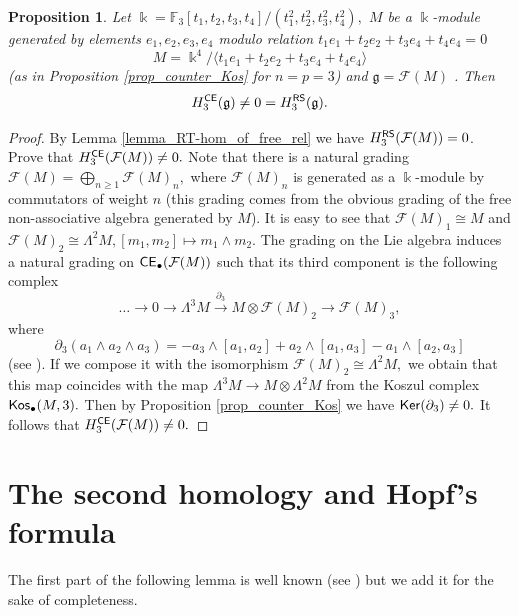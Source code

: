 \documentclass{amsart}
\numberwithin{equation}{section}
\newtheorem{proposition}[theorem]{Proposition}
\theoremstyle{definition}
\def\FF{\mathcal{F}}
\def\gg{\mathfrak{g}}
\def\kk{\Bbbk}
\begin{document}
\begin{proposition}\label{prop_counter_RSCE}
Let $\kk=\mathbb F_3[t_1,t_2,t_3,t_4]/(t_1^2,t_2^2,t_3^2,t_4^2),$ $M$ be a $\kk$-module generated by elements $e_1,e_2,e_3,e_4$ modulo relation $t_1e_1+t_2e_2+t_3e_4+t_4e_4=0$ $$M=\kk^4/\langle  t_1e_1+t_2e_2+t_3e_4+t_4e_4 \rangle$$
(as in Proposition \ref{prop_counter_Kos} for $n=p=3$) and $\gg=\FF(M)$ . Then 
$$H_3^{\sf CE}(\gg)\ne 0=H^{\sf RS}_3( \gg).$$
\end{proposition}
\begin{proof}  By Lemma \ref{lemma_RT-hom_of_free_rel} we have $H^{\sf RS}_3(\FF(M))=0$. Prove that $H_3^{\sf CE}(\FF(M))\ne 0.$  Note that there is a natural grading $\FF(M)=\bigoplus_{n\geq 1} \FF(M)_n,$ where $\FF(M)_n$ is generated as a $\kk$-module by commutators of weight $n$ (this grading comes from the obvious grading of the free non-associative algebra generated by $M$). It is easy to see that $\FF(M)_1\cong M$ and $\FF(M)_2\cong \Lambda^2 M, [m_1,m_2] \mapsto m_1\wedge m_2.$ The grading on the Lie algebra induces a natural grading  on ${\sf CE}_\bullet(\FF(M))$ such that its third component is the following complex
$$\dots \longrightarrow 0 \longrightarrow \Lambda^3M \overset{\partial_3}\longrightarrow M\otimes  \FF(M)_2 \longrightarrow \FF(M)_3,$$
where 
$$\partial_3(a_1\wedge a_2 \wedge a_3 )= - a_3\wedge  [a_1,a_2]+ a_2 \wedge [a_1,a_3] - a_1 \wedge  [a_2,a_3] $$
(see \cite[Prop. 2.2]{ivanov2020simple}). If we compose it with the isomorphism $\FF(M)_2\cong \Lambda^2M,$ we obtain that this map coincides with the map $\Lambda^3 M\to M\otimes \Lambda^2M$ from the Koszul complex ${\sf Kos}_\bullet(M,3).$ Then by Proposition \ref{prop_counter_Kos} we have ${\sf Ker}(\partial_3)\ne 0.$ It follows that $H^{\sf CE}_3(\FF(M))\ne 0.$ 
\end{proof}






\section{The second homology and Hopf's formula}

The first part of the following lemma is well known (see \cite[Exercise VI.19]{cartan1999homological}) but we add it for the sake of completeness. 
\end{document}
